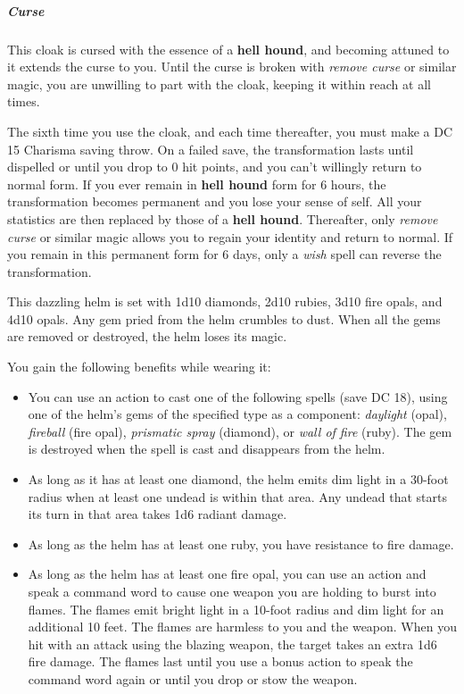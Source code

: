 \documentclass[10pt,a4paper,twoside,bg=print,twocolumn,openany,nodeprecatedcode]{dndbook}
\begin{document}
\subparagraph{Curse}
This cloak is cursed with the essence of a \textbf{hell hound}, and becoming attuned to it extends the curse to you. Until the curse is broken with \textit{remove curse} or similar magic, you are unwilling to part with the cloak, keeping it within reach at all times.

The sixth time you use the cloak, and each time thereafter, you must make a DC 15 Charisma saving throw. On a failed save, the transformation lasts until dispelled or until you drop to 0 hit points, and you can't willingly return to normal form. If you ever remain in \textbf{hell hound} form for 6 hours, the transformation becomes permanent and you lose your sense of self. All your statistics are then replaced by those of a \textbf{hell hound}. Thereafter, only \textit{remove curse} or similar magic allows you to regain your identity and return to normal. If you remain in this permanent form for 6 days, only a \textit{wish} spell can reverse the transformation.

This dazzling helm is set with 1d10 diamonds, 2d10 rubies, 3d10 fire opals, and 4d10 opals. Any gem pried from the helm crumbles to dust. When all the gems are removed or destroyed, the helm loses its magic.

You gain the following benefits while wearing it:


\begin{itemize}
\item You can use an action to cast one of the following spells (save DC 18), using one of the helm's gems of the specified type as a component: \textit{daylight} (opal), \textit{fireball} (fire opal), \textit{prismatic spray} (diamond), or \textit{wall of fire} (ruby). The gem is destroyed when the spell is cast and disappears from the helm.
\item As long as it has at least one diamond, the helm emits dim light in a 30-foot radius when at least one undead is within that area. Any undead that starts its turn in that area takes 1d6 radiant damage.
\item As long as the helm has at least one ruby, you have resistance to fire damage.
\item As long as the helm has at least one fire opal, you can use an action and speak a command word to cause one weapon you are holding to burst into flames. The flames emit bright light in a 10-foot radius and dim light for an additional 10 feet. The flames are harmless to you and the weapon. When you hit with an attack using the blazing weapon, the target takes an extra 1d6 fire damage. The flames last until you use a bonus action to speak the command word again or until you drop or stow the weapon.
\end{itemize}
\end{document}
